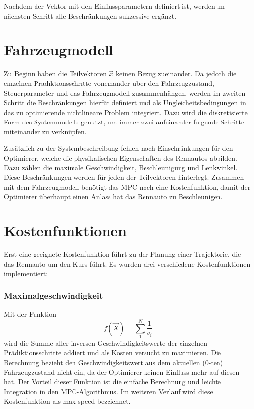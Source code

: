 \documentclass{like}
\begin{document}
  

Nachdem der Vektor mit den Einflussparametern definiert ist, werden im nächsten Schritt alle Beschränkungen sukzessive ergänzt.

\section{Fahrzeugmodell}
Zu Beginn haben die Teilvektoren $\vec{x}$ keinen Bezug zueinander. Da jedoch die einzelnen Prädiktionsschritte voneinander über den Fahrzeugzustand, Steuerparameter und das Fahrzeugmodell zusammenhängen, werden im zweiten Schritt die Beschränkungen hierfür definiert und als Ungleicheitsbedingungen in das zu optimierende nichtlineare Problem integriert. Dazu wird die diskretisierte Form des Systemmodells genutzt, um immer zwei aufeinander folgende Schritte miteinander zu verknüpfen. 

Zusätzlich zu der Systembeschreibung fehlen noch Einschränkungen für den Optimierer, welche die physikalischen Eigenschaften des Rennautos abbilden.
Dazu zählen die maximale Geschwindigkeit, Beschleunigung und Lenkwinkel. 
Diese Beschränkungen werden für jeden der Teilvektoren hinterlegt. 
Zusammen mit dem Fahrzeugmodell benötigt das \ac{MPC} noch eine Kostenfunktion, damit der Optimierer überhaupt einen Anlass hat das Rennauto zu Beschleunigen.


\section{Kostenfunktionen}
\label{costFunctions}
Erst eine geeignete Kostenfunktion führt zu der Planung einer Trajektorie, die das Rennauto um den Kurs führt. Es wurden drei verschiedene Kostenfunktionen implementiert:

\subsubsection*{Maximalgeschwindigkeit}  
Mit der Funktion 
\begin{equation}
	f(\vec{X}) =  \sum_{1}^{N} \frac{1}{v_i}
\end{equation}
wird die Summe aller inversen Geschwindigkeitswerte der einzelnen Prädiktionsschritte addiert und als Kosten versucht zu maximieren.
Die Berechnung bezieht den Geschwindigkeitswert aus dem aktuellen (0-ten) Fahrzeugzustand nicht ein, da der Optimierer keinen Einfluss mehr auf diesen hat. Der Vorteil dieser Funktion ist die einfache Berechnung und leichte Integration in den \ac{MPC}-Algorithmus. Im weiteren Verlauf wird diese Kostenfunktion als max-speed bezeichnet.
\end{document}
